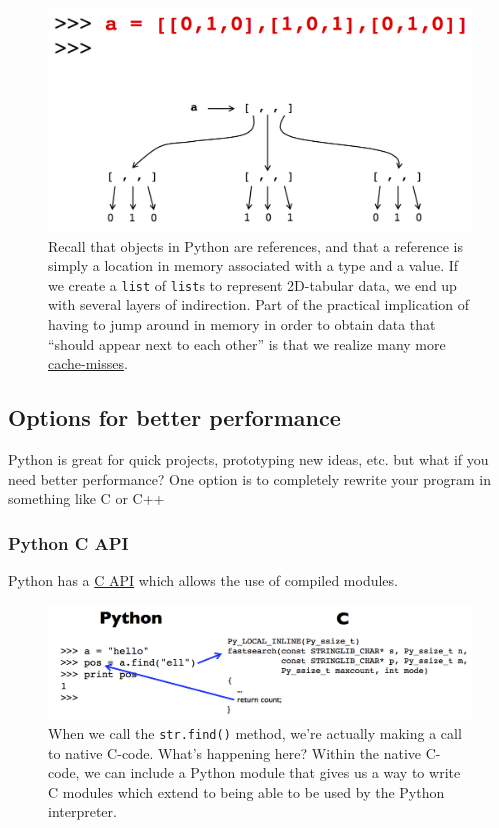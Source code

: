 \documentclass[12pt,letterpaper,twoside]{article}
\begin{document}
\begin{figure}[h]
\centering
\includegraphics[scale=0.45]{fig/object-overhead.png}
\caption{Recall that objects in Python are references, and that a
  reference is simply a location in memory associated with a type and
  a value. If we create a \texttt{list} of \texttt{list}s to represent
  2D-tabular data, we end up with several layers of indirection. Part
  of the practical implication of having to jump around in memory in
  order to obtain data that ``should appear next to each other'' is
  that we realize many more
  \href{https://en.wikipedia.org/wiki/CPU_cache\#Cache_miss}{cache-misses}.}
\end{figure}

\subsection{Options for better performance}

Python is great for quick projects, prototyping new ideas, etc. but
what if you need better performance?
One option is to completely rewrite your program in something like
C or C++

\subsubsection{Python C API}
Python has a \href{https://docs.python.org/3/c-api/intro.html}{C API}
which allows the use of compiled modules.

\begin{figure}[h]
\centering
\includegraphics[scale=0.45]{fig/python-c-interface.png}
\caption{When we call the \texttt{str.find()} method, we're actually
  making a call to native C-code. What's happening here?
  Within the native C-code, we can
  include a Python module that gives us a way to write C modules which
  extend to being able to be used by the Python interpreter.}
\end{figure}
\end{document}
